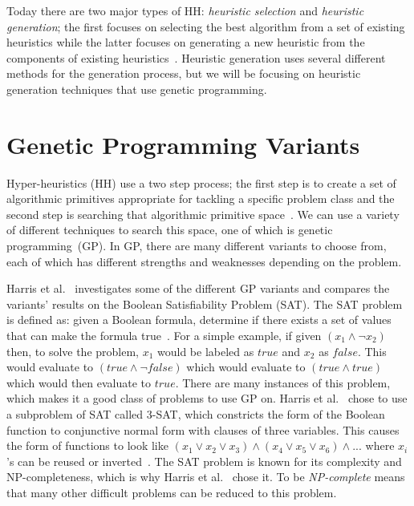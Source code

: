\documentclass{sig-alternate}
\begin{document}
Today there are two major types of HH: \textit{heuristic selection} and \textit{heuristic generation}; the first focuses on selecting the best algorithm from a set of existing heuristics while the latter focuses on generating a new heuristic from the components of existing heuristics~\cite{pappa:2014}. Heuristic generation uses several different methods for the generation process, but we will be focusing on heuristic generation techniques that use genetic programming.

\section{Genetic Programming Variants}
\label{sec:gpvariants}
Hyper-heuristics (HH) use a two step process; the first step is to create a set of algorithmic primitives appropriate for tackling a specific problem class and the second step is searching that algorithmic primitive space~\cite{harris:2015}. We can use a variety of different techniques to search this space, one of which is genetic programming~(GP). In GP, there are many different variants to choose from, each of which has different strengths and weaknesses depending on the problem.

Harris et al.~\cite{harris:2015} investigates some of the different GP variants and compares the variants' results on the Boolean Satisfiability Problem (SAT). The SAT problem is defined as: given a Boolean formula, determine if there exists a set of values that can make the formula true~\cite{harris:2015}. For a simple example, if given $(x_{1} \wedge \neg x_{2})$ then, to solve the problem, $x_{1}$ would be labeled as $true$ and $x_{2}$ as $false$. This would evaluate to $(true \wedge \neg false)$ which would evaluate to $(true \wedge true)$ which would then evaluate to $true$. There are many instances of this problem, which makes it a good class of problems to use GP on. Harris et al.~\cite{harris:2015} chose to use a subproblem of SAT called 3-SAT, which constricts the form of the Boolean function to conjunctive normal form with clauses of three variables. This causes the form of functions to look like $(x_{1} \vee x_{2} \vee x_{3}) \wedge (x_{4} \vee x_{5} \vee x_{6}) \wedge ...$ where $x_{i}$'s can be reused or inverted~\cite{harris:2015}. The SAT problem is known for its complexity and NP-completeness, which is why Harris et al.~\cite{harris:2015} chose it. To be \textit{NP-complete} means that many other difficult problems can be reduced to this problem. 
\end{document}
